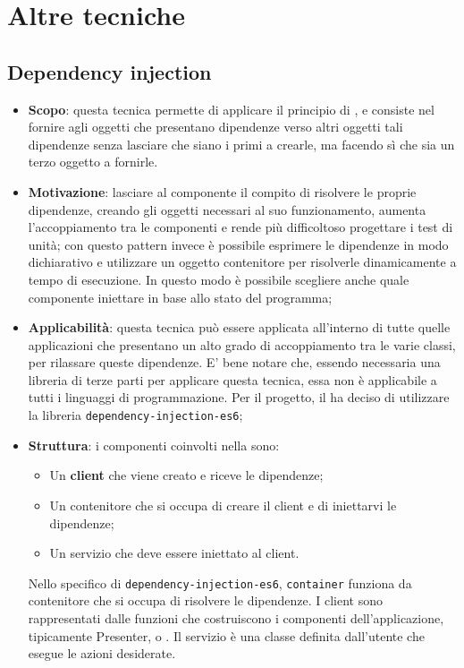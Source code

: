 \newpage
\section{Altre tecniche}
\subsection{Dependency injection}
\begin{itemize}
	\item \textbf{Scopo}: questa tecnica permette di applicare il principio di , e consiste nel fornire agli oggetti che presentano dipendenze verso altri oggetti tali dipendenze senza lasciare che siano i primi a crearle, ma facendo sì che sia un terzo oggetto a fornirle.
	\item \textbf{Motivazione}: lasciare al componente il compito di risolvere le proprie dipendenze, creando
gli oggetti necessari al suo funzionamento, aumenta l'accoppiamento tra le componenti e
rende più difficoltoso progettare i test di unità; con questo pattern invece è possibile esprimere
le dipendenze in modo dichiarativo e utilizzare un oggetto contenitore per risolverle
dinamicamente a tempo di esecuzione. In questo modo è possibile scegliere anche quale componente
iniettare in base allo stato del programma;
	\item \textbf{Applicabilità}: questa tecnica può essere applicata all'interno di tutte quelle applicazioni che presentano un alto grado di accoppiamento tra le varie classi, per rilassare queste dipendenze. E' bene notare che, essendo necessaria una libreria di terze parti per applicare questa tecnica, essa non è applicabile a tutti i linguaggi di programmazione. Per il progetto, il  ha deciso di utilizzare la libreria \texttt{dependency-injection-es6};
	\item \textbf{Struttura}: i componenti coinvolti nella  sono: 
	\begin{itemize}
		\item Un \textbf{client} che viene creato e riceve le dipendenze; 
		\item Un contenitore che si occupa di creare il client e di iniettarvi le dipendenze; 
		\item Un servizio che deve essere iniettato al client.
	\end{itemize}
	Nello specifico di \texttt{dependency-injection-es6}, \texttt{container} funziona da contenitore che si occupa di risolvere le dipendenze. I client sono rappresentati dalle funzioni che costruiscono i componenti dell'applicazione, tipicamente Presenter,  o . Il servizio è una classe definita dall'utente che esegue le azioni desiderate. \\

\end{itemize}
